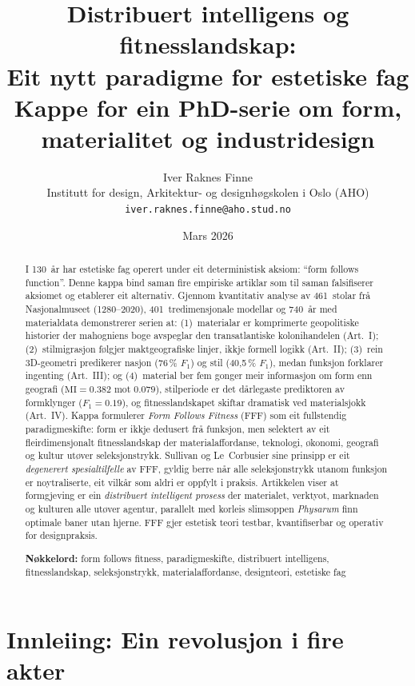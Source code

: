 \documentclass[12pt,a4paper]{article}
\title{Distribuert intelligens og fitnesslandskap:\\
\large Eit nytt paradigme for estetiske fag\\[0.5em]
\normalsize Kappe for ein PhD-serie om form, materialitet og industridesign}
\author{Iver Raknes Finne\\
\small Institutt for design, Arkitektur- og designh\o{}gskolen i Oslo (AHO)\\
\small\texttt{iver.raknes.finne@aho.stud.no}}
\date{Mars 2026}
\begin{document}
\maketitle

\begin{abstract}
\noindent
I 130~\aa{}r har estetiske fag operert under eit deterministisk aksiom: \enquote{form follows function}. Denne kappa bind saman fire empiriske artiklar som til saman falsifiserer aksiomet og etablerer eit alternativ. Gjennom kvantitativ analyse av 461~stolar fr\aa{} Nasjonalmuseet (1280--2020), 401~tredimensjonale modellar og 740~\aa{}r med materialdata demonstrerer serien at: (1)~materialar er komprimerte geopolitiske historier der mahogniens boge avspeglar den transatlantiske kolonihandelen (Art.~I); (2)~stilmigrasjon f\o{}lgjer maktgeografiske linjer, ikkje formell logikk (Art.~II); (3)~rein 3D-geometri predikerer nasjon (76\,\% $F_1$) og stil (40{,}5\,\% $F_1$), medan funksjon forklarer ingenting (Art.~III); og (4)~material ber fem gonger meir informasjon om form enn geografi ($\mathrm{MI} = 0.382$ mot $0.079$), stilperiode er det d\aa{}rlegaste prediktoren av formklynger ($F_1 = 0.19$), og fitnesslandskapet skiftar dramatisk ved materialsjokk (Art.~IV). Kappa formulerer \emph{Form Follows Fitness} (FFF) som eit fullstendig paradigmeskifte: form er ikkje dedusert fr\aa{} funksjon, men selektert av eit fleirdimensjonalt fitnesslandskap der materialaffordanse, teknologi, \o{}konomi, geografi og kultur ut\o{}ver seleksjonstrykk. Sullivan og Le~Corbusier sine prinsipp er eit \emph{degenerert spesialtilfelle} av FFF, gyldig berre n\aa{}r alle seleksjonstrykk utanom funksjon er noytraliserte, eit vilk\aa{}r som aldri er oppfylt i praksis. Artikkelen viser at formgjeving er ein \emph{distribuert intelligent prosess} der materialet, verktyot, marknaden og kulturen alle ut\o{}ver agentur, parallelt med korleis slimsoppen \emph{Physarum} finn optimale baner utan hjerne. FFF gjer estetisk teori testbar, kvantifiserbar og operativ for designpraksis.

\medskip
\noindent\textbf{N\o{}kkelord:} form follows fitness, paradigmeskifte, distribuert intelligens, fitnesslandskap, seleksjonstrykk, materialaffordanse, designteori, estetiske fag
\end{abstract}

\section{Innleiing: Ein revolusjon i fire akter}
\label{sec:innleiing}
\end{document}
